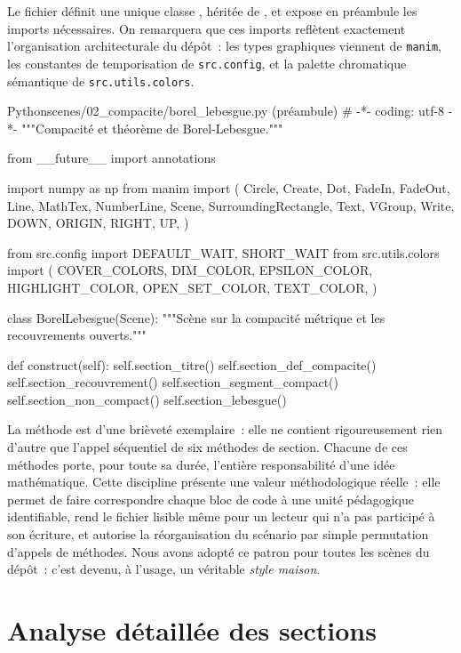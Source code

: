 \documentclass[12pt, a4paper, openany]{report}
\begin{document}
	Le fichier définit une unique classe , héritée de , et expose en préambule les imports nécessaires. On remarquera que ces imports reflètent exactement l’organisation architecturale du dépôt~: les types graphiques viennent de \texttt{manim}, les constantes de temporisation de \texttt{src.config}, et la palette chromatique sémantique de \texttt{src.utils.colors}.

	\begin{codefile}{Python}{scenes/02\_compacite/borel\_lebesgue.py (préambule)}
# -*- coding: utf-8 -*-
"""Compacité et théorème de Borel-Lebesgue."""

from __future__ import annotations

import numpy as np
from manim import (
    Circle, Create, Dot, FadeIn, FadeOut, Line, MathTex,
    NumberLine, Scene, SurroundingRectangle, Text, VGroup, Write,
    DOWN, ORIGIN, RIGHT, UP,
)

from src.config import DEFAULT_WAIT, SHORT_WAIT
from src.utils.colors import (
    COVER_COLORS, DIM_COLOR, EPSILON_COLOR,
    HIGHLIGHT_COLOR, OPEN_SET_COLOR, TEXT_COLOR,
)


class BorelLebesgue(Scene):
    """Scène sur la compacité métrique et les recouvrements ouverts."""

    def construct(self):
        self.section_titre()
        self.section_def_compacite()
        self.section_recouvrement()
        self.section_segment_compact()
        self.section_non_compact()
        self.section_lebesgue()
	\end{codefile}

	La méthode  est d’une brièveté exemplaire~: elle ne contient rigoureusement rien d’autre que l’appel séquentiel de six méthodes de section. Chacune de ces méthodes porte, pour toute sa durée, l’entière responsabilité d’une idée mathématique. Cette discipline présente une valeur méthodologique réelle~: elle permet de faire correspondre chaque bloc de code à une unité pédagogique identifiable, rend le fichier lisible même pour un lecteur qui n’a pas participé à son écriture, et autorise la réorganisation du scénario par simple permutation d’appels de méthodes. Nous avons adopté ce patron pour toutes les scènes du dépôt~: c’est devenu, à l’usage, un véritable \emph{style maison}.
	
	\section{Analyse détaillée des sections}
\end{document}
